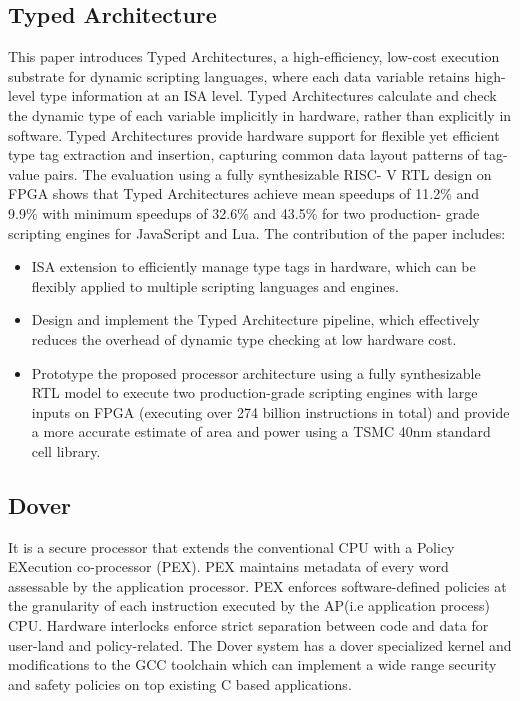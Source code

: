 \subsection{Typed Architecture \cite{TypedArchitecture}}
This paper introduces Typed
Architectures, a high-efficiency, low-cost execution substrate 
for dynamic scripting languages, where each data
variable retains high-level type information at an ISA level.
Typed Architectures calculate and check the dynamic type
of each variable implicitly in hardware, rather than explicitly
in software. Typed Architectures provide
hardware support for flexible yet efficient type tag extraction
and insertion, capturing common data layout patterns of tag-
value pairs. The evaluation using a fully synthesizable RISC-
V RTL design on FPGA shows that Typed Architectures
achieve mean speedups of 11.2\% and 9.9\% with
minimum speedups of 32.6\% and 43.5\% for two production-
grade scripting engines for JavaScript and Lua. 
The contribution of the paper includes:
\begin{itemize}
  \item ISA extension to efficiently manage
type tags in hardware, which can be flexibly applied to
multiple scripting languages and engines.
  \item Design and implement the Typed Architecture pipeline,
which effectively reduces the overhead of dynamic type
checking at low hardware cost.
  \item Prototype the proposed processor architecture using 
a fully synthesizable RTL model to execute two
production-grade scripting engines with large inputs on
FPGA (executing over 274 billion instructions in total)
and provide a more accurate estimate of area and power
using a TSMC 40nm standard cell library.
\end{itemize}

\subsection{Dover \cite{Dover}}
It is a secure processor that extends the conventional CPU with
a Policy EXecution co-processor (PEX). PEX maintains metadata 
of every word assessable by the application processor. PEX 
enforces software-defined policies
at the granularity of each instruction executed by the AP(i.e application process)
CPU. Hardware interlocks enforce strict separation between code and data 
for user-land and policy-related. The Dover system has 
a dover specialized kernel and modifications to the GCC toolchain 
which can implement a wide range security and safety policies on 
top existing C based applications. 

